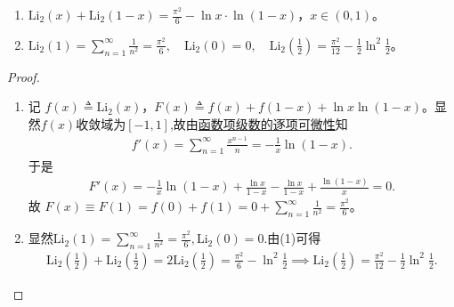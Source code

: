 \documentclass[../../main.tex]{subfiles}%
\begin{document}
\begin{proposition}\label{proposition:Li_2函数的性质}
\begin{enumerate}[(1)]
\item $\mathrm{Li}_2(x) + \mathrm{Li}_2(1-x) = \frac{\pi^2}{6} - \ln x \cdot \ln(1-x)$，$x \in (0,1)$。  

\item $\mathrm{Li}_2\left( 1 \right) =\sum_{n=1}^{\infty}{\frac{1}{n^2}}=\frac{\pi ^2}{6},\quad \mathrm{Li}_2\left( 0 \right) =0,\quad \mathrm{Li}_2\left(\frac{1}{2}\right) = \frac{\pi^2}{12} - \frac{1}{2} \ln^2 \frac{1}{2}$。
\end{enumerate}
\end{proposition}
\begin{proof}
\begin{enumerate}[(1)]
\item 记 $f(x) \triangleq \mathrm{Li}_2(x)$，$F(x) \triangleq f(x) + f(1-x) + \ln x \ln(1-x)$。显然$f(x)$收敛域为$[-1,1]$,故由\hyperref[theorem:函数项级数的逐项可微性]{函数项级数的逐项可微性}知
\begin{align*}
f'(x) = \sum_{n=1}^{\infty} \frac{x^{n-1}}{n} = -\frac{1}{x} \ln(1-x).
\end{align*}  
于是  
\begin{align*}
F'(x) = -\frac{1}{x} \ln(1-x) + \frac{\ln x}{1-x} - \frac{\ln x}{1-x} + \frac{\ln(1-x)}{x} = 0.
\end{align*}  
故 $F(x) \equiv F(1) = f(0) + f(1) = 0 + \sum_{n=1}^{\infty} \frac{1}{n^2} = \frac{\pi^2}{6}$。  

\item 显然$\mathrm{Li}_2\left( 1 \right) =\sum_{n=1}^{\infty}{\frac{1}{n^2}}=\frac{\pi ^2}{6},\mathrm{Li}_2\left( 0 \right) =0.$由(1)可得  
\begin{align*}
\mathrm{Li}_2\left(\frac{1}{2}\right) + \mathrm{Li}_2\left(\frac{1}{2}\right) = 2\mathrm{Li}_2\left(\frac{1}{2}\right) = \frac{\pi^2}{6} - \ln^2 \frac{1}{2} \implies \mathrm{Li}_2\left(\frac{1}{2}\right) = \frac{\pi^2}{12} - \frac{1}{2} \ln^2 \frac{1}{2}.
\end{align*}  
\end{enumerate}
\end{proof}
\end{document}
